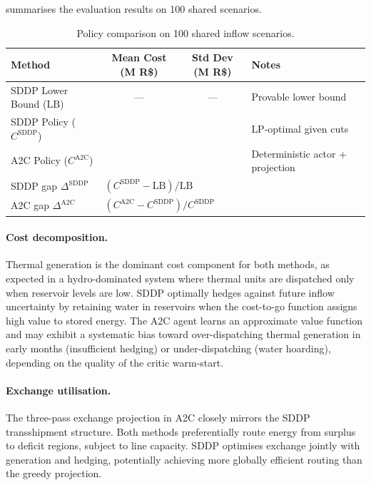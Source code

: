 \documentclass[11pt,letterpaper]{article}
\begin{document}
 summarises the evaluation results on 100 shared scenarios.

\begin{table}[H]
  \centering
  \caption{Policy comparison on 100 shared inflow scenarios.}
  \label{tab:comparison}
  \begin{tabular}{lccl}
    \toprule
    Method & Mean Cost (M R\$) & Std Dev (M R\$) & Notes \\
    \midrule
    SDDP Lower Bound ($\mathrm{LB}$) & --- & --- & Provable lower bound \\
    SDDP Policy ($C^{\mathrm{SDDP}}$) & & & LP-optimal given cuts \\
    A2C Policy ($C^{\mathrm{A2C}}$)    & & & Deterministic actor + projection \\
    \midrule
    SDDP gap $\Delta^{\mathrm{SDDP}}$ & \multicolumn{3}{l}{$(C^{\mathrm{SDDP}} - \mathrm{LB})/\mathrm{LB}$} \\
    A2C gap $\Delta^{\mathrm{A2C}}$   & \multicolumn{3}{l}{$(C^{\mathrm{A2C}} - C^{\mathrm{SDDP}})/C^{\mathrm{SDDP}}$} \\
    \bottomrule
  \end{tabular}
\end{table}

\paragraph{Cost decomposition.}
Thermal generation is the dominant cost component for both methods, as expected
in a hydro-dominated system where thermal units are dispatched only when reservoir
levels are low.  SDDP optimally hedges against future inflow uncertainty by
retaining water in reservoirs when the cost-to-go function assigns high value
to stored energy.  The A2C agent learns an approximate value function and may
exhibit a systematic bias toward over-dispatching thermal generation in early
months (insufficient hedging) or under-dispatching (water hoarding), depending
on the quality of the critic warm-start.

\paragraph{Exchange utilisation.}
The three-pass exchange projection in A2C closely mirrors the SDDP transshipment
structure.  Both methods preferentially route energy from surplus to deficit
regions, subject to line capacity.  SDDP optimises exchange jointly with
generation and hedging, potentially achieving more globally efficient routing
than the greedy projection.
\end{document}
